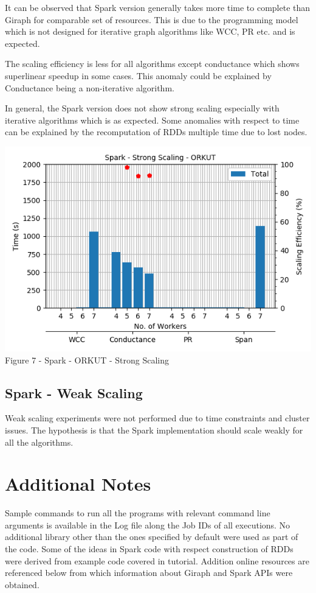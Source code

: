 \documentclass[11pt,a4paper,oneside]{article}
\begin{document}
    It can be observed that Spark version generally takes more time to complete than Giraph for comparable set of resources. This is due to the programming model which is not designed for iterative graph algorithms like WCC, PR etc. and is expected.
    
    The scaling efficiency is less for all algorithms except conductance which shows superlinear speedup in some cases. This anomaly could be explained by Conductance being a non-iterative algorithm.
    
    In general, the Spark version does not show strong scaling especially with iterative algorithms which is as expected. Some anomalies with respect to time can be explained by the recomputation of RDDs multiple time due to lost nodes.
    

    \begin{center}
    	\includegraphics[scale=0.5]{7.png} \\
    	Figure 7 - Spark - ORKUT - Strong Scaling	
    \end{center}

   \subsection{Spark - Weak Scaling}
   
   Weak scaling experiments were not performed due to time constraints and cluster issues. The hypothesis is that the Spark implementation should scale weakly for all the algorithms.
   
   \section{Additional Notes}
   Sample commands to run all the programs with relevant command line arguments is available in the Log file along the Job IDs of all executions. No additional library other than the ones specified by default were used as part of the code. Some of the ideas in Spark code with respect construction of RDDs were derived from example code covered in tutorial. Addition online resources are referenced below from which information about Giraph and Spark APIs were obtained.
    
\end{document}
